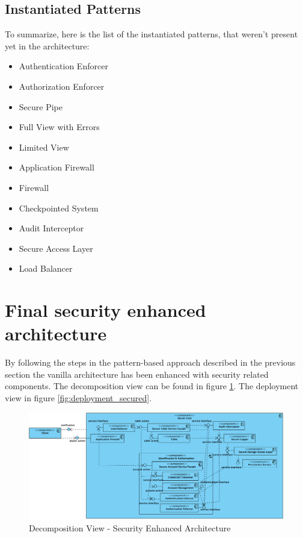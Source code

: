 \documentclass[a4paper,11pt]{report}
\begin{document}
\subsection{Instantiated Patterns}
\label{inst_patterns}
To summarize, here is the list of the instantiated patterns, that weren't present yet in the architecture:
\begin{itemize}
\item Authentication Enforcer
\item Authorization Enforcer
\item Secure Pipe
\item Full View with Errors
\item Limited View
\item Application Firewall
\item Firewall
\item Checkpointed System
\item Audit Interceptor
\item Secure Access Layer
\item Load Balancer
\end{itemize}

\section{Final security enhanced architecture}
By following the steps in the pattern-based approach described in the previous section the vanilla architecture has been enhanced with security related components. The decomposition view can be found in figure \ref{fig:decomposition_secured}. The deployment view in figure \ref{fig:deployment_secured}.

\begin{figure}[htpb]
  \begin{center}
    \includegraphics[angle=90,scale=0.65]{component_secured.png}
  \end{center}
  \caption{Decomposition View - Security Enhanced Architecture}\label{fig:decomposition_secured}
\end{figure}
\end{document}
